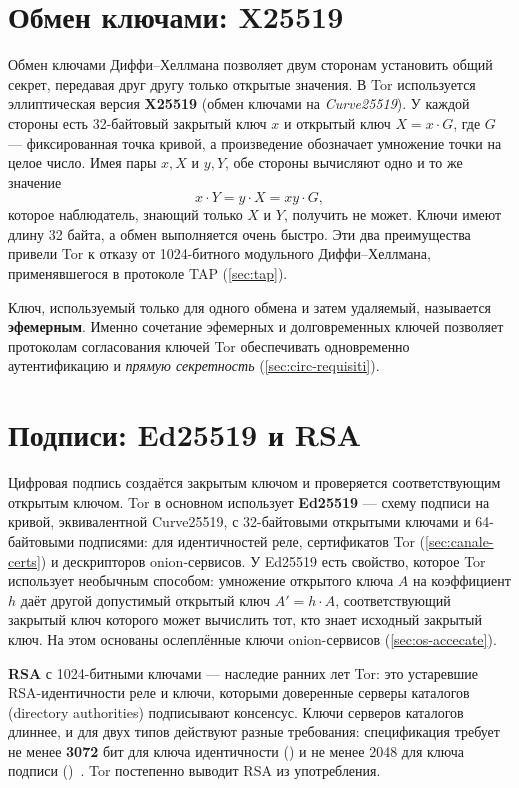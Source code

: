 \section{Обмен ключами: X25519}\label{sec:cripto-dh}

Обмен ключами Диффи--Хеллмана позволяет двум сторонам установить общий секрет, передавая друг другу только открытые значения. В Tor используется эллиптическая версия \textbf{X25519} (обмен ключами на \emph{Curve25519}). У каждой стороны есть 32-байтовый закрытый ключ $x$ и открытый ключ $X = x \cdot G$, где $G$ --- фиксированная точка кривой, а произведение обозначает умножение точки на целое число. Имея пары $x, X$ и $y, Y$, обе стороны вычисляют одно и то же значение
\[ x \cdot Y = y \cdot X = xy \cdot G, \]
которое наблюдатель, знающий только $X$ и $Y$, получить не может. Ключи имеют длину 32 байта, а обмен выполняется очень быстро. Эти два преимущества привели Tor к отказу от 1024-битного модульного Диффи--Хеллмана, применявшегося в протоколе TAP (\cref{sec:tap}).

Ключ, используемый только для одного обмена и затем удаляемый, называется \textbf{эфемерным}. Именно сочетание эфемерных и долговременных ключей позволяет протоколам согласования ключей Tor обеспечивать одновременно аутентификацию и \emph{прямую секретность} (\cref{sec:circ-requisiti}).

\section{Подписи: Ed25519 и RSA}\label{sec:cripto-firme}

Цифровая подпись создаётся закрытым ключом и проверяется соответствующим открытым ключом. Tor в основном использует \textbf{Ed25519} --- схему подписи на кривой, эквивалентной Curve25519, с 32-байтовыми открытыми ключами и 64-байтовыми подписями: для идентичностей реле, сертификатов Tor (\cref{sec:canale-certs}) и дескрипторов onion-сервисов. У Ed25519 есть свойство, которое Tor использует необычным способом: умножение открытого ключа $A$ на коэффициент $h$ даёт другой допустимый открытый ключ $A' = h \cdot A$, соответствующий закрытый ключ которого может вычислить тот, кто знает исходный закрытый ключ. На этом основаны ослеплённые ключи onion-сервисов (\cref{sec:os-accecate}).

\textbf{RSA} с 1024-битными ключами --- наследие ранних лет Tor: это устаревшие RSA-идентичности реле и ключи, которыми доверенные серверы каталогов (directory authorities) подписывают консенсус. Ключи серверов каталогов длиннее, и для двух типов действуют разные требования: спецификация требует не менее \textbf{3072} бит для ключа идентичности () и не менее 2048 для ключа подписи ()~. Tor постепенно выводит RSA из употребления.

